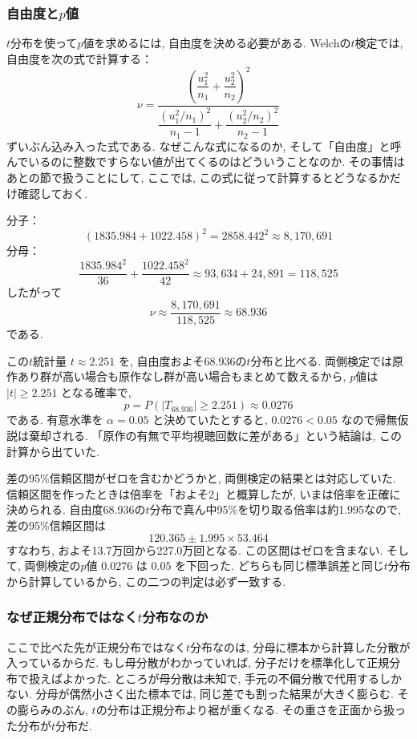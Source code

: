     \subsubsection*{自由度と\texorpdfstring{$p$}{p}値}

    $t$分布を使って$p$値を求めるには, 自由度を決める必要がある.
    Welchの$t$検定では, 自由度を次の式で計算する：
    \[
      \nu = \frac{\left( \dfrac{u_1^2}{n_1} + \dfrac{u_2^2}{n_2} \right)^2}
                  {\dfrac{(u_1^2/n_1)^2}{n_1 - 1} + \dfrac{(u_2^2/n_2)^2}{n_2 - 1}}
    \]
    ずいぶん込み入った式である.
    なぜこんな式になるのか, そして「自由度」と呼んでいるのに整数ですらない値が出てくるのはどういうことなのか.
    その事情はあとの節で扱うことにして, ここでは, この式に従って計算するとどうなるかだけ確認しておく.

    分子：
    \[
      (1835.984 + 1022.458)^2 = 2858.442^2 \approx 8{,}170{,}691
    \]
    分母：
    \[
      \frac{1835.984^2}{36} + \frac{1022.458^2}{42}
      \approx 93{,}634 + 24{,}891 = 118{,}525
    \]
    したがって
    \[
      \nu \approx \frac{8{,}170{,}691}{118{,}525} \approx 68.936
    \]
    である.

    この$t$統計量 $t \approx 2.251$ を, 自由度およそ$68.936$の$t$分布と比べる.
    両側検定では原作あり群が高い場合も原作なし群が高い場合もまとめて数えるから, $p$値は $|t| \geq 2.251$ となる確率で,
    \[
      p = P(|T_{68.936}| \geq 2.251) \approx 0.0276
    \]
    である.
    有意水準を $\alpha = 0.05$ と決めていたとすると, $0.0276 < 0.05$ なので帰無仮説は棄却される.
    「原作の有無で平均視聴回数に差がある」という結論は, この計算から出ていた.

    差の95\%信頼区間がゼロを含むかどうかと, 両側検定の結果とは対応していた.
    信頼区間を作ったときは倍率を「およそ2」と概算したが, いまは倍率を正確に決められる.
    自由度68.936の$t$分布で真ん中95\%を切り取る倍率は約1.995なので, 差の95\%信頼区間は
    \[
      120.365 \pm 1.995 \times 53.464
    \]
    すなわち, およそ13.7万回から227.0万回となる.
    この区間はゼロを含まない.
    そして, 両側検定の$p$値 $0.0276$ は $0.05$ を下回った.
    どちらも同じ標準誤差と同じ$t$分布から計算しているから, この二つの判定は必ず一致する.

    \subsubsection*{なぜ正規分布ではなく\texorpdfstring{$t$}{t}分布なのか}

    ここで比べた先が正規分布ではなく$t$分布なのは, 分母に標本から計算した分散が入っているからだ.
    もし母分散がわかっていれば, 分子だけを標準化して正規分布で扱えばよかった.
    ところが母分散は未知で, 手元の不偏分散で代用するしかない.
    分母が偶然小さく出た標本では, 同じ差でも割った結果が大きく膨らむ.
    その膨らみのぶん, $t$の分布は正規分布より裾が重くなる.
    その重さを正面から扱った分布が$t$分布だ.

